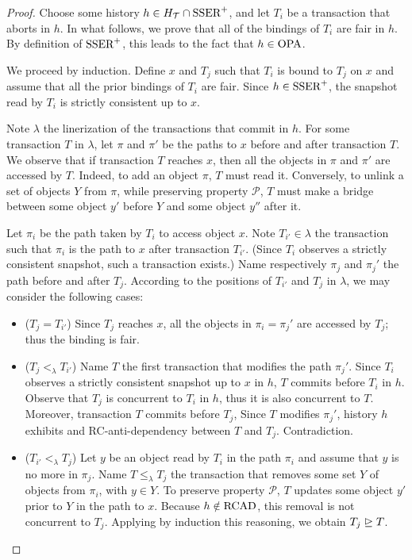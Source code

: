 \begin{proof}
  Choose some history $h \in H_{\mathcal{T}} \inter \SPSER$, and let $T_i$ be a transaction that aborts in $h$.
  In what follows, we prove that all of the bindings of $T_i$ are fair in $h$.
  By definition of $\SPSER$, this leads to the fact that $h \in \OPA$.

  We proceed by induction.
  Define $x$ and $T_j$ such that $T_i$ is bound to $T_j$ on $x$ and assume that all the prior bindings of $T_i$ are fair.
  Since $h \in \SPSER$, the snapshot read by $T_i$ is strictly consistent up to $x$.

  Note $\lambda$ the linerization of the transactions that commit in $h$.
  For some transaction $T$ in $\lambda$, let $\pi$ and $\pi'$ be the paths to $x$ before and after transaction $T$.
  We observe that if transaction $T$ reaches $x$, then all the objects in $\pi$ and $\pi'$ are accessed by $T$.
  Indeed, to add an object $\pi$, $T$ must read it.
  Conversely, to unlink a set of objects $Y$ from $\pi$, while preserving property $\mathcal{P}$, $T$ must make a bridge between some object $y'$ before $Y$ and some object $y''$ after it.

  Let $\pi_i$ be the path taken by $T_i$ to access object $x$.
  Note $T_{i'} \in \lambda$ the transaction such that $\pi_i$ is the path to $x$ after transaction $T_{i'}$.
  (Since $T_i$ observes a strictly consistent snapshot, such a transaction exists.)
  Name respectively $\pi_j$ and ${\pi_j}'$ the path before and after $T_j$.  
  According to the positions of $T_{i'}$ and $T_{j}$ in $\lambda$, we may consider the following cases:
  \begin{itemize}
  \item ($T_j = T_{i'}$)
    Since $T_j$ reaches $x$, all the objects in $\pi_i = {\pi_j}'$ are accessed by $T_j$; thus the binding is fair.
  \item ($T_{j} <_{\lambda} T_{i'}$)
    Name $T$ the first transaction that modifies the path ${\pi_j}'$.
    Since $T_i$ observes a strictly consistent snapshot up to $x$ in $h$, $T$ commits before $T_i$ in $h$.
    Observe that $T_j$ is concurrent to $T_i$ in $h$, thus it is also concurrent to $T$.
    Moreover, transaction $T$ commits before $T_j$,
    Since $T$ modifies ${\pi_j}'$, history $h$ exhibits and RC-anti-dependency between $T$ and $T_j$.
    Contradiction.
  \item ($T_{i'} <_{\lambda} T_j$)
    Let $y$ be an object read by $T_i$ in the path $\pi_i$ and assume that $y$ is no more in $\pi_j$.
    Name $T \leq_{\lambda} T_{j}$ the transaction that removes some set $Y$ of objects from $\pi_i$, with $y \in Y$.
    To preserve property $\mathcal{P}$, $T$ updates some object $y'$ prior to $Y$ in the path to $x$.
    Because $h \notin \RCAD$, this removal is not concurrent to $T_j$.
    Applying by induction this reasoning, we obtain $T_j \mathrel{\unrhd} T$.
  \end{itemize}
\end{proof}

